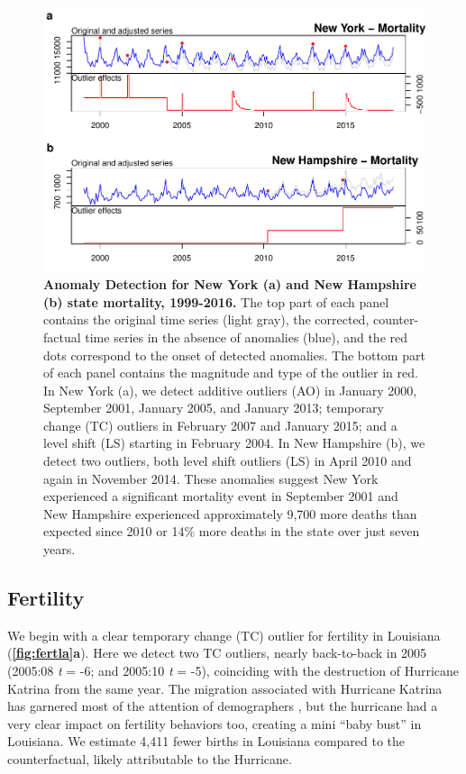 \documentclass[12pt]{article}
\begin{document}
\begin{figure}
\centering
\includegraphics{manuscript_files/figure-latex/MortalityNewHamp-1.pdf}
\caption{\textbf{Anomaly Detection for New York (a) and New Hampshire (b) state mortality, 1999-2016.}
The top part of each panel contains the original time series (light
gray), the corrected, counter-factual time series in the absence of
anomalies (blue), and the red dots correspond to the onset of detected
anomalies. The bottom part of each panel contains the magnitude and type
of the outlier in red. In New York (a), we detect additive outliers (AO)
in January 2000, September 2001, January 2005, and January 2013;
temporary change (TC) outliers in February 2007 and January 2015; and a
level shift (LS) starting in February 2004. In New Hampshire (b), we
detect two outliers, both level shift outliers (LS) in April 2010 and
again in November 2014. These anomalies suggest New York experienced a
significant mortality event in September 2001 and New Hampshire
experienced approximately 9,700 more deaths than expected since 2010 or
14\% more deaths in the state over just seven years.
\label{fig:mortnewhamp}}
\end{figure}

\hypertarget{fertility}{%
\subsection{Fertility}\label{fertility}}

We begin with a clear temporary change (TC) outlier for fertility in
Louisiana (\textbf{\autoref{fig:fertla}a}). Here we detect two TC
outliers, nearly back-to-back in 2005 (2005:08 \emph{t} = -6; and
2005:10 \emph{t} = -5), coinciding with the destruction of Hurricane
Katrina from the same year. The migration associated with Hurricane
Katrina has garnered most of the attention of demographers
\citep{fussellRecoveryMigrationCity2014, horiDisplacementDynamicsSouthern2009},
but the hurricane had a very clear impact on fertility behaviors too,
creating a mini ``baby bust'' in Louisiana. We estimate 4,411 fewer
births in Louisiana compared to the counterfactual, likely attributable
to the Hurricane.
\end{document}
